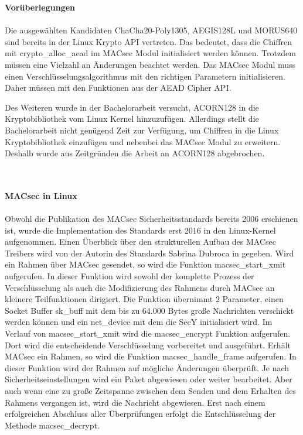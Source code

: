 
\textbf{Vorüberlegungen}
\\
\\
Die ausgewählten Kandidaten ChaCha20-Poly1305, AEGIS128L und MORUS640 sind bereits in der Linux Krypto API vertreten. 
Das bedeutet, dass die Chiffren mit crypto\_alloc\_aead im MACsec Modul initialisiert werden können.
Trotzdem müssen eine Vielzahl an Änderungen beachtet werden. Das MACsec Modul muss einen Verschlüsselungsalgorithmus mit den richtigen Parametern initialisieren. Daher müssen mit den Funktionen aus der AEAD Cipher API. 

Des Weiteren wurde in der Bachelorarbeit versucht, ACORN128 in die Kryptobibliothek vom Linux Kernel hinzuzufügen. Allerdings stellt die Bachelorarbeit nicht genügend Zeit zur Verfügung, um Chiffren in die Linux Kryptobibliothek einzufügen und nebenbei das MACsec Modul zu erweitern. Deshalb wurde aus Zeitgründen die Arbeit an ACORN128 abgebrochen.


\\
\\
\textbf{MACsec in Linux}
\\
\\
Obwohl die Publikation des MACsec Sicherheitsstandards bereits 2006 erschienen ist, wurde die Implementation des Standards  erst 2016 in den Linux-Kernel aufgenommen. Einen Überblick über den strukturellen Aufbau des MACsec Treibers wird von der Autorin des Standards Sabrina Dubroca in \cite{dubroca} gegeben. 
Wird ein Rahmen über MACsec gesendet, so wird die Funktion macsec\_start\_xmit aufgerufen. In dieser Funktion wird sowohl der komplette Prozess der Verschlüsselung als auch die Modifizierung des Rahmens durch MACsec an kleinere Teilfunktionen dirigiert. Die Funktion übernimmt 2 Parameter, einen Socket Buffer sk\_buff mit dem bis zu 64.000 Bytes große Nachrichten verschickt werden können und ein net\_device mit dem die SecY initialisiert wird. Im Verlauf von macsec\_start\_xmit wird die macsec\_encrypt Funktion aufgerufen. Dort wird die entscheidende Verschlüsselung vorbereitet und ausgeführt.
Erhält MACsec ein Rahmen, so wird die Funktion macsec\_handle\_frame aufgerufen. In dieser Funktion wird der Rahmen auf mögliche Änderungen überprüft. Je nach Sicherheitseinstellungen wird ein Paket abgewiesen oder weiter bearbeitet. Aber auch wenn eine zu große Zeitspanne zwischen dem Senden und dem Erhalten des Rahmens vergangen ist, wird die Nachricht abgewiesen. Erst nach einem erfolgreichen Abschluss aller Überprüfungen erfolgt die Entschlüsselung der Methode macsec\_decrypt.
\\
\\

